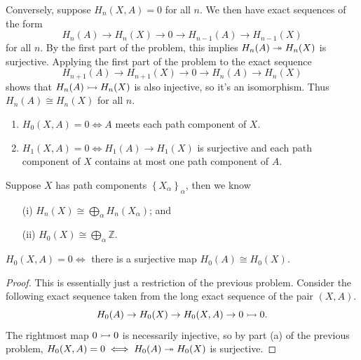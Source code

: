 \documentclass[twoside,10pt]{article}
\begin{document}
Conversely, suppose $H_{n}(X,A) = 0$ for all $n$. We then have exact sequences of the form
\[
	H_{n}(A) \to H_{n}(X) \to 0 \to H_{n-1}(A) \to H_{n-1}(X)
\] for all $n$. By the first part of the problem, this implies $H_{n}(A) \twoheadrightarrow H_{n}(X)$ is surjective. Applying the first part of the problem to the exact sequence
\[
H_{n+1}(A) \to H_{n+1}(X) \to 0 \to H_{n}(A) \to H_{n}(X)
\] shows that $H_{n}(A) \rightarrowtail H_{n}(X)$ is also injective, so it's an isomorphism. Thus $H_{n}(A) \cong H_{n}(X)$ for all $n$.

\newpage

\begin{exer}[2.1: 16]
\begin{enumerate}
	\item $H_{0}(X,A) = 0 \iff A$ meets each path component of $X$.
	\item $H_{1}(X,A)=0 \iff H_{1}(A) \to H_{1}(X)$ is surjective and each path component of $X$ contains at most one path component of $A$.
\end{enumerate}
\end{exer}

Suppose $X$ has path components $\left\{ X_{\alpha} \right\}_{\alpha}$, then we know
\begin{enumerate}
	\item[(i)] $H_{n}(X) \cong \bigoplus_{\alpha}H_{n}(X_{\alpha})$; and
	\item[(ii)] $H_{0}(X) \cong \bigoplus_{\alpha}\mathbb{Z}$.
\end{enumerate}

\begin{lem}
	$H_0(X,A) = 0 \iff$ there is a surjective map $H_0(A) \cong H_0(X)$.
\end{lem}
\begin{proof}
	This is essentially just a restriction of the previous problem. Consider the following exact sequence taken from the long exact sequence of the pair $(X,A)$.
	\[
		H_0(A) \to H_0(X) \to H_0(X,A) \to 0 \rightarrowtail 0.
	\] The rightmost map $0 \rightarrowtail 0$ is necessarily injective, so by part (a) of the previous problem, $H_0(X,A) = 0 \iff H_0(A) \twoheadrightarrow H_0(X)$ is surjective.
\end{proof}
\end{document}
